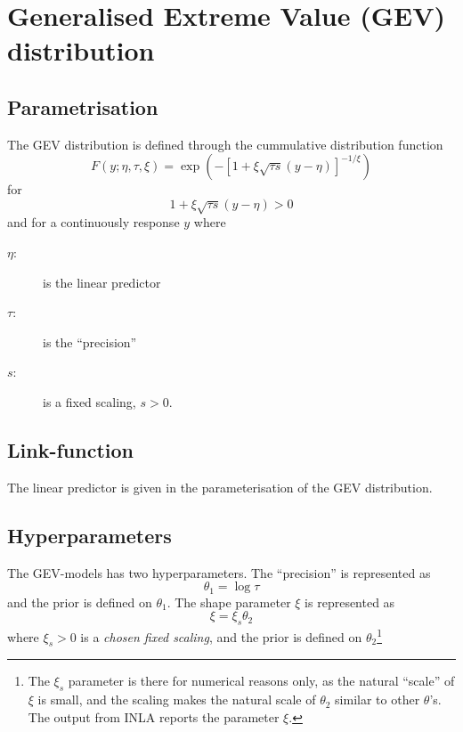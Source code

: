 \documentclass[a4paper,11pt]{article}
\begin{document}
\section*{Generalised Extreme Value (GEV) distribution}

\subsection*{Parametrisation}

The GEV distribution is defined through the cummulative distribution
function
\begin{displaymath}
    F(y; \eta, \tau, \xi) =
    \exp\left(
      - \left[ 1 + \xi \sqrt{\tau s} (y-\eta)\right]^{-1/\xi}
    \right)
\end{displaymath}
for
\begin{displaymath}
    1 + \xi \sqrt{\tau s} (y-\eta) > 0
\end{displaymath}
and for a continuously response $y$ where
\begin{description}
\item[$\eta$:] is the linear predictor
\item[$\tau$:] is the ``precision''
\item[$s$:] is a fixed scaling, $s>0$.    
\end{description}

\subsection*{Link-function}

The linear predictor is given in the parameterisation of the GEV
distribution.

\subsection*{Hyperparameters}

The GEV-models has two hyperparameters.
The ``precision'' is represented as
\begin{displaymath}
    \theta_{1} = \log \tau
\end{displaymath}
and the prior is defined on $\theta_{1}$.  The shape parameter $\xi$
is represented as
\begin{displaymath}
    \xi = \xi_{s}\theta_{2}
\end{displaymath}
where $\xi_{s} > 0$ is a \emph{chosen fixed scaling}, and the prior is
defined on $\theta_{2}$\footnote{The $\xi_{s}$ parameter is there for
    numerical reasons only, as the natural ``scale'' of $\xi$ is
    small, and the scaling makes the natural scale of $\theta_{2}$
    similar to other $\theta$'s. The output from INLA reports the
    parameter $\xi$.}
\end{document}
